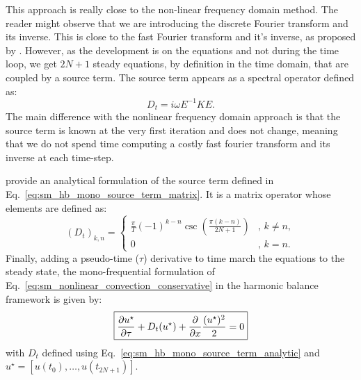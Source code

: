 This approach is really close to the non-linear frequency domain method.
The reader might observe that we are introducing the discrete Fourier
transform and its inverse. This is close to the fast Fourier transform
and it's inverse, as proposed by \citet{McMullen2001}. However,
as the development is on the equations and not during the time loop,
we get $2N+1$ steady equations, by definition in the time
domain, that are coupled by a source term.
The source term appears as a spectral operator defined as:
\begin{equation}
	D_t = i \omega E^{-1} K E.
	\label{eq:sm_hb_mono_source_term_matrix}
\end{equation}
The main difference with the nonlinear frequency domain approach
is that the source term is known at the very first iteration and does
not change, meaning that we do not spend time computing a costly
fast fourier transform and its inverse at each time-step. 

\citet{Gopinath2005} provide an analytical formulation of the
source term defined in Eq.~\ref{eq:sm_hb_mono_source_term_matrix}.
It is a matrix operator whose elements are defined as:
\begin{equation}
  (D_t)_{k, n} =
  \begin{cases}
    \frac{\pi}{T}(-1)^{k-n}\csc\left(\frac{\pi
        (k-n)}{2N+1}\right) &, \, k\neq n,\\
    0 &, \, k=n.
  \end{cases}
  \label{eq:sm_hb_mono_source_term_analytic}
\end{equation}
Finally, adding a pseudo-time ($\tau$) derivative to 
time march the equations to the steady state, 
the mono-frequential formulation of 
Eq.~\ref{eq:sm_nonlinear_convection_conservative} in the harmonic
balance framework is given by:
\begin{equation}
	\fbox{$
	\displaystyle \frac{\partial u^\star}{\partial \tau} + 
	D_t (u^\star) + 
	\displaystyle \frac{\partial}{\partial x}
		\frac{(u^\star)^2}{2} = 0
	$}
\end{equation}
with $D_t$ defined using Eq.~\ref{eq:sm_hb_mono_source_term_analytic}
and $u^\star = [u(t_0), \ldots, u(t_{2N+1})]$.

